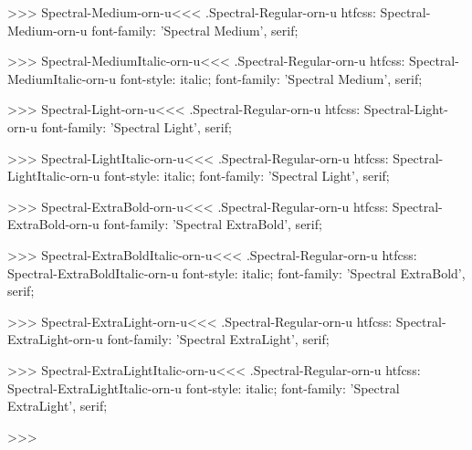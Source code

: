 >>>
\<Spectral-Medium-orn-u\><<<
.Spectral-Regular-orn-u
htfcss:  Spectral-Medium-orn-u  font-family: 'Spectral Medium', serif;

>>>
\<Spectral-MediumItalic-orn-u\><<<
.Spectral-Regular-orn-u
htfcss:  Spectral-MediumItalic-orn-u  font-style: italic; font-family: 'Spectral Medium', serif;

>>>
\<Spectral-Light-orn-u\><<<
.Spectral-Regular-orn-u
htfcss:  Spectral-Light-orn-u  font-family: 'Spectral Light', serif;

>>>
\<Spectral-LightItalic-orn-u\><<<
.Spectral-Regular-orn-u
htfcss:  Spectral-LightItalic-orn-u  font-style: italic; font-family: 'Spectral Light', serif;

>>>
\<Spectral-ExtraBold-orn-u\><<<
.Spectral-Regular-orn-u
htfcss:  Spectral-ExtraBold-orn-u  font-family: 'Spectral ExtraBold', serif;

>>>
\<Spectral-ExtraBoldItalic-orn-u\><<<
.Spectral-Regular-orn-u
htfcss:  Spectral-ExtraBoldItalic-orn-u  font-style: italic; font-family: 'Spectral ExtraBold', serif;

>>>
\<Spectral-ExtraLight-orn-u\><<<
.Spectral-Regular-orn-u
htfcss:  Spectral-ExtraLight-orn-u  font-family: 'Spectral ExtraLight', serif;

>>>
\<Spectral-ExtraLightItalic-orn-u\><<<
.Spectral-Regular-orn-u
htfcss:  Spectral-ExtraLightItalic-orn-u  font-style: italic; font-family: 'Spectral ExtraLight', serif;

>>>
\bye
